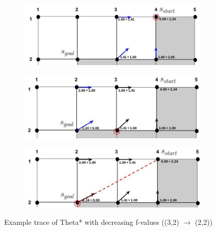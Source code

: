 \documentclass[12pt]{article}
\begin{document}
\begin{enumerate}[label=(\alph*)]
    \begin{figure}
        \begin{subfigure}{0.5\textwidth}
            \centering
            \includegraphics[width=\textwidth]{homework1/images/drawndiagrams/prob1l/prob1la.jpg}
            \caption{}
            \label{fig:prob1la}
        \end{subfigure}
        \begin{subfigure}{0.5\textwidth}
            \centering
            \includegraphics[width=\textwidth]{homework1/images/drawndiagrams/prob1l/prob1lb.jpg}
            \caption{}
            \label{fig:prob1lb}
        \end{subfigure}
        \begin{subfigure}{\textwidth}
            \centering
            \includegraphics[scale = 0.7]{homework1/images/drawndiagrams/prob1l/prob1lc.jpg}
            \caption{}
            \label{fig:prob1lc}
        \end{subfigure}
        \caption{Example trace of Theta* with decreasing f-values ((3,2) $\xrightarrow{}$ (2,2))}
    \end{figure}

\end{enumerate}
\end{document}
